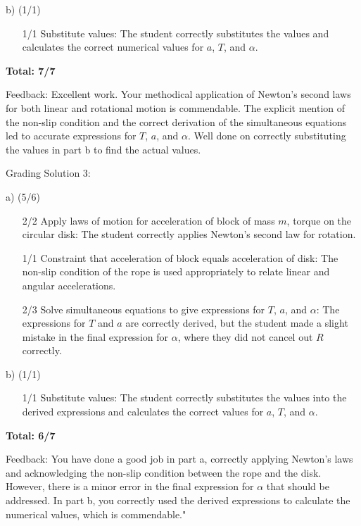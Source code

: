 \documentclass[a4paper,11pt]{article}
\begin{document}
b) (1/1)
\begin{itemize}
    \item[1/1] Substitute values: The student correctly substitutes the values and calculates the correct numerical values for $a$, $T$, and $ \alpha $.
\end{itemize}

\textbf{Total: 7/7}

Feedback: Excellent work. Your methodical application of Newton's second laws for both linear and rotational motion is commendable. The explicit mention of the non-slip condition and the correct derivation of the simultaneous equations led to accurate expressions for $T$, $a$, and $ \alpha $. Well done on correctly substituting the values in part b to find the actual values.

Grading Solution 3:

a) (5/6)
\begin{itemize}
    \item[2/2] Apply laws of motion for acceleration of block of mass $m$, torque on the circular disk: The student correctly applies Newton's second law for rotation.
    \item[1/1] Constraint that acceleration of block equals acceleration of disk: The non-slip condition of the rope is used appropriately to relate linear and angular accelerations.
    \item[2/3] Solve simultaneous equations to give expressions for $T$, $a$, and $ \alpha $: The expressions for $T$ and $a$ are correctly derived, but the student made a slight mistake in the final expression for $ \alpha $, where they did not cancel out $R$ correctly.
\end{itemize}

b) (1/1)
\begin{itemize}
    \item[1/1] Substitute values: The student correctly substitutes the values into the derived expressions and calculates the correct values for $a$, $T$, and $ \alpha $.
\end{itemize}

\textbf{Total: 6/7}

Feedback: You have done a good job in part a, correctly applying Newton's laws and acknowledging the non-slip condition between the rope and the disk. However, there is a minor error in the final expression for \(\alpha\) that should be addressed. In part b, you correctly used the derived expressions to calculate the numerical values, which is commendable."
\end{document}
